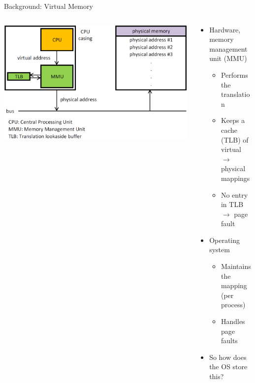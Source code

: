 \documentclass[aspectratio=169]{beamer}
\newcommand{\bi}{\begin{itemize}}
\newcommand{\ei}{\end{itemize}}
\begin{document}
\begin{frame}{Background: Virtual Memory}
  \begin{columns}[T]
    \begin{column}{0.5\textwidth}
      \vspace{-1em}
      \includegraphics[scale=0.2]{./figures/MMU.png}
    \end{column}
    \begin{column}{0.5\textwidth}
      \vspace{5em}
      \bi
    \item Hardware, memory management unit (MMU)
      \bi
    \item Performs the translation
    \item Keeps a cache (TLB) of\\virtual $\rightarrow$ physical mappings
    \item No entry in TLB $\rightarrow$ page fault
      \ei
      \pause
    \item Operating system
      \bi
    \item Maintains the mapping (per process)
    \item Handles page faults
      \ei
      \pause
    \item So how does the OS store this?
      \ei
    \end{column}
  \end{columns}
\end{frame}
\end{document}
